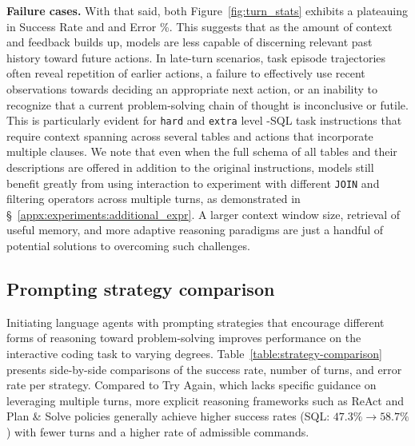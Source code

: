 \textbf{Failure cases.} With that said, both Figure~\ref{fig:turn_stats} exhibits a plateauing in Success Rate and and Error \%.
This suggests that as the amount of context and feedback builds up, models are less capable of discerning relevant past history toward future actions.
In late-turn scenarios, task episode trajectories often reveal repetition of earlier actions, a failure to effectively use recent observations towards deciding an appropriate next action, or an inability to recognize that a current problem-solving chain of thought is inconclusive or futile.
This is particularly evident for \texttt{hard} and \texttt{extra} level \benchmark{}-SQL task instructions that require context spanning across several tables and actions that incorporate multiple clauses.
We note that even when the full schema of all tables and their descriptions are offered in addition to the original instructions, models still benefit greatly from using interaction to experiment with different \texttt{JOIN} and filtering operators across multiple turns, as demonstrated in \S~\ref{appx:experiments:additional_expr}.
A larger context window size, retrieval of useful memory, and more adaptive reasoning paradigms are just a handful of potential solutions to overcoming such challenges.

\subsection{Prompting strategy comparison}
\label{sec:experiments:strategy_compare}
Initiating language agents with prompting strategies that encourage different forms of reasoning toward problem-solving improves performance on the interactive coding task to varying degrees. Table~\ref{table:strategy-comparison} presents side-by-side comparisons of the success rate, number of turns, and error rate per strategy. 
Compared to Try Again, which lacks specific guidance on leveraging multiple turns, more explicit reasoning frameworks such as ReAct and Plan \& Solve policies generally achieve higher success rates (SQL: $47.3\% \rightarrow 58.7\%$) with fewer turns and a higher rate of admissible commands.




